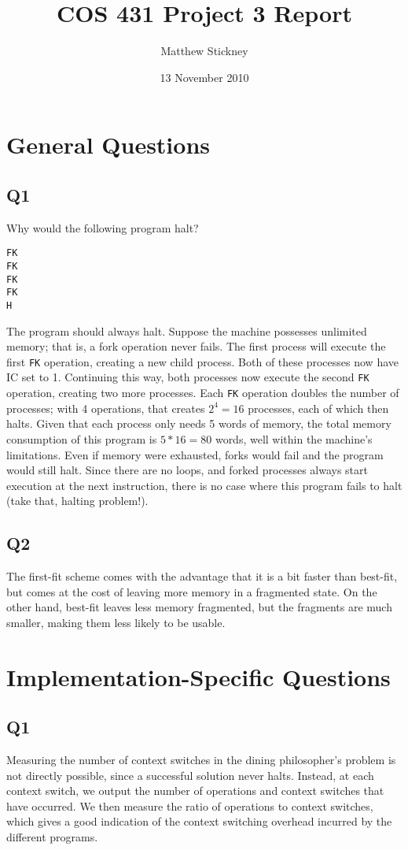 \documentclass[12pt]{article}
\author{Matthew Stickney}
\date{13 November 2010}
\title{COS 431 Project 3 Report}
\begin{document}
\maketitle
\section{General Questions}
\subsection{Q1}
Why would the following program halt?
\begin{lstlisting}
FK
FK
FK
FK
H
\end{lstlisting}

The program should always halt. Suppose the machine possesses unlimited memory;
that is, a fork operation never fails. The first process will execute the first \lstinline!FK! operation,
creating a new child process. Both of these processes now have IC set to 1. Continuing
this way, both processes now execute the second \lstinline!FK! operation, creating two
more processes. Each \lstinline!FK! operation doubles the number of processes; with 4
operations, that creates $2^4=16$ processes, each of which then halts. Given that each
process only needs 5 words of memory, the total memory consumption of this program
is $5*16=80$ words, well within the machine's limitations. Even if memory were exhausted,
forks would fail and the program would still halt. Since there are no loops, and forked
processes always start execution at the next instruction, there is no case where this program
fails to halt (take that, halting problem!).
\subsection{Q2}
The first-fit scheme comes with the advantage that it is a bit faster than best-fit, but comes at the
cost of leaving more memory in a fragmented state. On the other hand, best-fit leaves less memory
fragmented, but the fragments are much smaller, making them less likely to be usable.
\section{Implementation-Specific Questions}
\subsection{Q1}
Measuring the number of context switches in the dining philosopher's problem is
not directly possible, since a successful solution never halts. Instead, at each context
switch, we output the number of operations and context switches that have occurred.
We then measure the ratio of operations to context switches, which gives a good indication
of the context switching overhead incurred by the different programs.
\end{document}
